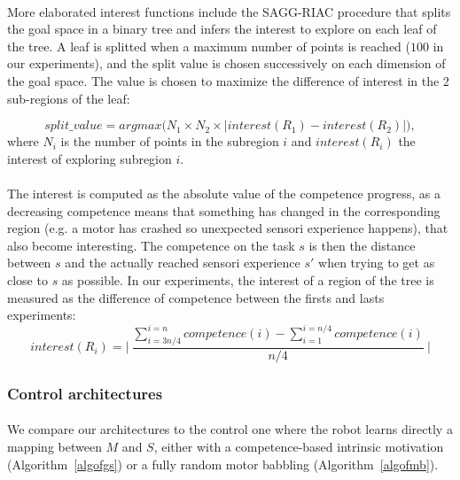 \documentclass[12pt]{article}
\begin{document}
			\paragraph{}
			More elaborated interest functions include the SAGG-RIAC procedure \cite{baranes2010intrinsically}
			that splits the goal space in a binary tree and infers the interest to explore on each leaf of the tree.
			A leaf is splitted when a maximum number of points is reached ($100$ in our experiments), and the 
			split value is chosen successively on each dimension of the goal space. 
			The value is chosen to maximize the difference of interest in the 2 sub-regions of the leaf:
			
			$$split\_value = argmax\big(N_1\times N_2 \times |interest(R_1) - interest(R_2)|\big),$$
			where $N_i$ is the number of points in the subregion $i$ and $interest(R_i)$ the interest of exploring subregion $i$.
			
			
			\paragraph{}
			The interest is computed as the absolute value of the competence progress, as a decreasing competence means 
			that something has changed in the corresponding region (e.g. a motor has crashed so unexpected sensori experience happens), that also become interesting.			
			The competence on the task $s$ is then the distance between $s$ and the actually reached sensori experience $s'$ when trying to get as close to 
			$s$ as possible.
			In our experiments, the interest of a region of the tree is measured as the difference of competence between the firsts and lasts experiments: 
			$$interest(R_i) = \Bigg|~ \frac{\sum\limits_{i=3n/4}^{i=n}competence(i) - \sum\limits_{i=1}^{i=n/4}competence(i)}{n/4}~\Bigg|$$
													
		

		
		\subsubsection{Control architectures}
		
			\paragraph{}
			We compare our architectures to the control one where the robot learns directly a mapping between $M$ and $S$, 
			either with a competence-based intrinsic motivation (Algorithm~\ref{algofgs}) or a fully random motor babbling (Algorithm~\ref{algofmb}).
			
\end{document}
